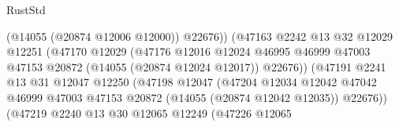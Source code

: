 \begin{lexlean}{RustStd}
\begin{coremodule}
                                                (@14055 (@20874 @12006 @12000))
                                                @22676))
                                            (@47163
                                              @2242
                                              @13
                                              @32
                                              @12029
                                              @12251
                                              (@47170
                                                @12029
                                                (@47176
                                                  @12016
                                                  @12024
                                                  @46995
                                                  @46999
                                                  @47003
                                                  @47153
                                                  @20872
                                                  (@14055 (@20874 @12024 @12017))
                                                  @22676))
                                              (@47191
                                                @2241
                                                @13
                                                @31
                                                @12047
                                                @12250
                                                (@47198
                                                  @12047
                                                  (@47204
                                                    @12034
                                                    @12042
                                                    @47042
                                                    @46999
                                                    @47003
                                                    @47153
                                                    @20872
                                                    (@14055 (@20874 @12042 @12035))
                                                    @22676))
                                                (@47219
                                                  @2240
                                                  @13
                                                  @30
                                                  @12065
                                                  @12249
                                                  (@47226
                                                    @12065

\end{coremodule}
\end{lexlean}
